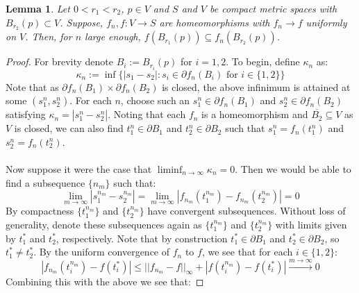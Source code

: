 \documentclass[11pt]{article}
\newcommand{\1}{\mathbf{1}}
\newtheorem{lemma}{Lemma}%
\theoremstyle{definition}
\theoremstyle{remark}
\begin{document}
\begin{mdframed}
    \begin{lemma}\label{lem:images_nested}
        Let $0<r_1<r_2$, $p\in V$ and $S$ and $V$ be compact metric spaces with $B_{r_2}(p)\subset V$. Suppose, $f_n,f:V\rightarrow S$ are homeomorphisms with $f_n\rightarrow f$ uniformly on $V$. Then, for $n$ large enough, $f(B_{r_1}(p)) \subseteq f_n(B_{r_2}(p))$. 
    \end{lemma}
    \vspace{0.2cm}
\end{mdframed}
\begin{proof}
    For brevity denote $B_i:=B_{r_i}(p)$ for $i=1,2$. To begin, define $\kappa_n$ as:
    \begin{equation}\nonumber
        \kappa_n:=\inf\big\{|s_1-s_2|: s_i \in \partial f_n(B_i) \text{ for } i \in \{1,2\}\big\}
    \end{equation}
    Note that as $\partial f_n(B_1)\times \partial f_n(B_2)$ is closed, the above infinimum is attained at some $(s_1^n, s_2^n)$. For each $n$, choose such an $s_1^n\in\partial f_n(B_1)$ and $s_2^n\in\partial f_n(B_2)$ satisfying $\kappa_n=|s_1^n-s_2^n|$. Noting that each $f_n$ is a homeomorphism and $\overline{B_2}\subseteq V$ as $V$ is closed, we can also find $t_1^n\in \partial B_1$ and $t_2^n\in \partial B_2$ such that $s_1^n=f_n(t_1^n)$ and $s_2^n=f_n(t_2^n)$. \\
    \\
    Now suppose it were the case that $\liminf_{n\rightarrow\infty}\kappa_n = 0$. Then we would be able to find a subsequence $\{n_m\}$ such that:
    \begin{equation}\nonumber
        \lim_{m\rightarrow \infty}|s_1^{n_m}-s_2^{n_m}| = \lim_{m\rightarrow \infty}|f_{n_m}(t_1^{n_m})-f_{n_m}(t_2^{n_m})| = 0
    \end{equation}
    By compactness $\{t_1^{n_m}\}$ and $\{t_2^{n_m}\}$ have convergent subsequences. Without loss of generality, denote these subsequences again as $\{t_1^{n_m}\}$ and $\{t_2^{n_m}\}$ with limits given by $t_1^*$ and $t_2^*$, respectively. Note that by construction $t_1^*\in \partial B_1$ and $t_2^*\in \partial B_2$, so $t_1^*\neq t_2^*$. By the uniform convergence of $f_n$ to $f$, we see that for each $i\in\{1,2\}$:
    \begin{equation}\nonumber
        |f_{n_m}(t_i^{n_m})-f(t_i^*)| \leq ||f_{n_m}-f||_\infty + |f(t_i^{n_m})-f(t_i^*)|\xrightarrow{m\rightarrow\infty} 0
    \end{equation}
    Combining this with the above we see that:

\end{proof}
\end{document}

